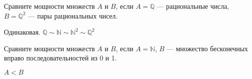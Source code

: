 \begin{problem}
Сравните мощности множеств $ A $ и $ B $, если $ A=\mathbb{Q} $ --- рациональные числа, $ B=\mathbb{Q}^{2} $ --- пары рациональных чисел.
\end{problem} 
\begin{solution} 
Одинаковая. $ \mathbb{Q}\sim \mathbb{N}\sim \mathbb{N}^{2}\sim \mathbb{Q}^{2} $
\end{solution}

\begin{problem}
Сравните мощности множеств $A$ и $B$, если $A=\mathbb{N}$, $B$ --- множество бесконечных вправо последовательностей из 0 и 1.
\end{problem} 
\begin{solution} 
$A<B$
\end{solution}

